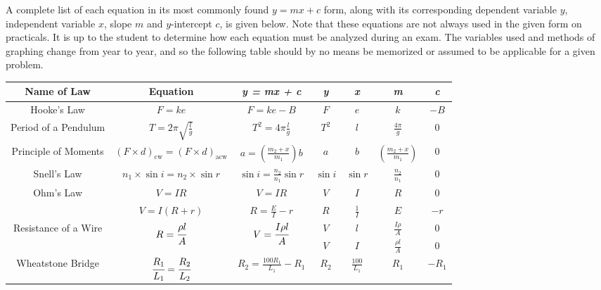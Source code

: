 A complete list of each equation in its most commonly found $y = mx + c$ form, along with its corresponding dependent variable $y$, independent variable $x$, slope
$m$ and $y$-intercept $c$, is given below. Note that these equations are not always used in the given form on practicals. It is up to the student to determine how each equation must be analyzed during an exam. The variables used and methods of graphing change from year to year, and so the following table should by no means be memorized or assumed to be applicable for a given problem.

\begin{center}
\begin{tabular}{|c|c|c|c|c|c|c|} \hline
\textbf{Name of Law} & \textbf{Equation} & \textit{\textbf{y = mx + c}} & \textit{\textbf{y}} & \textit{\textbf{x}} & \textit{\textbf{m}} & \textit{\textbf{c}} \\ \hline \hline
Hooke's Law & $ F = ke $ & $ F = ke - B $ & $F$ & $e$ & $k$ & $-B$\\ \hline
Period of a Pendulum & $T = 2\pi\sqrt{\frac{l}{g}}$ & $T^2 = 4\pi \frac{l}{g}$ & $T^2$ & $l$ & $\frac{4\pi}{g}$ & 0\\ \hline
Principle of Moments & $(F \times d)_{\mathrm{cw}} = (F \times d)_{\mathrm{acw}}$ & $a = \left(\frac{m_2 + x}{m_1}\right)b$ & $a$ & $b$ & $\left(\frac{m_2 + x}{m_1}\right)$ & 0\\ \hline
Snell's Law & $n_1 \times \sin{i} = n_2 \times \sin{r}$ & $\sin{i} = \frac{n_2}{n_1}\sin{r}$ & $\sin{i}$ & $\sin{r}$ & $\frac{n_2}{n_1}$ & 0\\ \hline
\multirow{2}{*}{Ohm's Law} & $V=IR$ & $V=IR$ & $V$ & $I$ & $R$ & 0 \\ 
& $V = I(R + r)$ & $R = \frac{E}{I} - r$ & $R$ & $\frac{1}{I}$ & $E$ & $-r$ \\ \hline
\multirow{2}{*}{Resistance of a Wire} & \multirow{2}{*}{$R = \cfrac{\rho l}{A}$} & \multirow{2}{*}{$V = \cfrac{I\rho l}{A}$} & $V$ & $l$ & $\frac{I\rho}{A}$ & 0\\ 
& & & $V$ & $I$ & $\frac{\rho l}{A}$ & 0 \\ \hline
Wheatstone Bridge & $\cfrac{R_1}{L_1} = \cfrac{R_2}{L_2}$ & $R_2 = \frac{100R_1}{L_1} - R_1$ & $R_2$ & $\frac{100}{L_1}$ & $R_1$ & $-R_1$ \\ \hline
\end{tabular}
\end{center}

